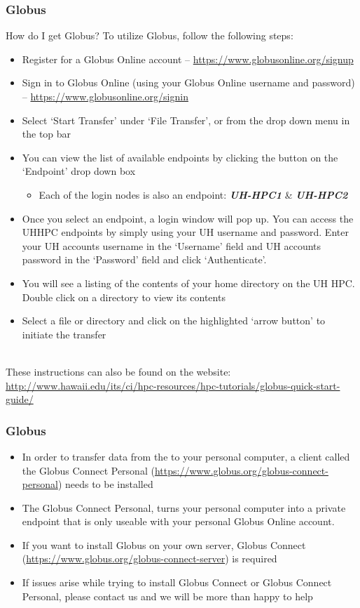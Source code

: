 \begin{frame}
	\frametitle{Globus}\footnotesize
\begin{block}{How do I get Globus?}
To utilize Globus, follow the following steps:
\begin{itemize}\tiny
\item Register for a Globus Online account -- \url{https://www.globusonline.org/signup}
\item Sign in to Globus Online (using your Globus Online username and password) -- \url{https://www.globusonline.org/signin}
\item Select ‘Start Transfer’ under ‘File Transfer’, or from the drop down menu in the top bar
\item You can view the list of available endpoints by clicking the button on the ‘Endpoint’ drop down box
\begin{itemize}\tiny
 \item Each of the login nodes is also an endpoint: \textbf{\emph{UH-HPC1}} \& \textbf{\emph{UH-HPC2}}
\end{itemize}
\item Once you select an endpoint, a login window will pop up. You can access the UHHPC endpoints by simply using your UH username and password. Enter your UH accounts username in the ‘Username’ field and UH accounts password in the ‘Password’ field and click ‘Authenticate’. 
\item You will see a listing of the contents of your home directory on the UH HPC. Double click on a directory to view its contents
\item Select a file or directory and click on the highlighted ‘arrow button’ to initiate the transfer
\end{itemize}
\end{block}
~\\
These instructions can also be found on the {\ci} website:~\\
{\footnotesize \href{http://www.hawaii.edu/its/ci/hpc-resources/hpc-tutorials/globus-quick-start-guide/}{http://www.hawaii.edu/its/ci/hpc-resources/hpc-tutorials/globus-quick-start-guide/}}
\end{frame}


\begin{frame}
	\frametitle{Globus}
        \begin{itemize}
          \item In order to transfer data from the {\craycs} to your personal computer, a client called the Globus Connect Personal (\url{https://www.globus.org/globus-connect-personal}) needs to be installed
          \item The Globus Connect Personal, turns your personal computer into a private endpoint that is only useable with your personal Globus Online account.
          \item If you want to install Globus on your own server, Globus Connect (\url{https://www.globus.org/globus-connect-server}) is required
            \item If issues arise while trying to install Globus Connect or Globus Connect Personal,  please contact us and we will be more than happy to help
\end{itemize} 
\end{frame}

